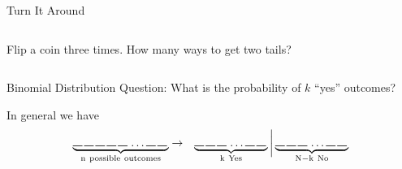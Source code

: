 \begin{frame}{Turn It Around}

 \begin{columns}

    Flip a coin three times. How many ways to get two tails?



  \end{columns}
  
\end{frame}


\begin{frame}{Binomial Distribution}
    Question: What is the probability of $k$ ``yes'' outcomes?

  \vfill

  In general we have 
  \begin{eqnarray*}
    \underbrace{
      \rule{.3cm}{.2mm} \hspace{.05cm} 
      \rule{.3cm}{.2mm} \hspace{.05cm} 
      \rule{.3cm}{.2mm} \hspace{.05cm} 
      \rule{.3cm}{.2mm} \hspace{.05cm} 
      \rule{.3cm}{.2mm} \hspace{.05cm} \ldots
      \rule{.3cm}{.2mm} \hspace{.05cm} 
      \rule{.3cm}{.2mm} \hspace{.05cm}}_{\mathrm{n~possible~outcomes}}
    & \rightarrow & 
    \underbrace{
      \rule{.3cm}{.2mm} \hspace{.05cm} 
      \rule{.3cm}{.2mm} \hspace{.05cm} 
      \rule{.3cm}{.2mm} \hspace{.05cm} \ldots
      \rule{.3cm}{.2mm} \hspace{.05cm} 
      \rule{.3cm}{.2mm} \hspace{.05cm}}_{\mathrm{k~Yes}}
    \bigg|
    \underbrace{
      \rule{.3cm}{.2mm} \hspace{.05cm} 
      \rule{.3cm}{.2mm} \hspace{.05cm} 
      \rule{.3cm}{.2mm} \hspace{.05cm} \ldots
      \rule{.3cm}{.2mm} \hspace{.05cm} 
      \rule{.3cm}{.2mm} \hspace{.05cm}}_{\mathrm{N-k~No}}
  \end{eqnarray*}

\end{frame}


